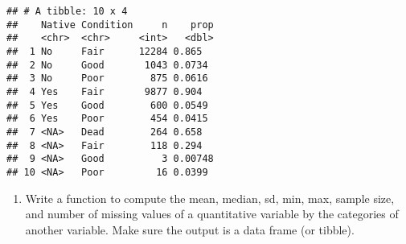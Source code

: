 \documentclass[
]{article}
\providecommand{\tightlist}{%
  \setlength{\itemsep}{0pt}\setlength{\parskip}{0pt}}
\begin{document}
\begin{verbatim}
## # A tibble: 10 x 4
##    Native Condition     n    prop
##    <chr>  <chr>     <int>   <dbl>
##  1 No     Fair      12284 0.865  
##  2 No     Good       1043 0.0734 
##  3 No     Poor        875 0.0616 
##  4 Yes    Fair       9877 0.904  
##  5 Yes    Good        600 0.0549 
##  6 Yes    Poor        454 0.0415 
##  7 <NA>   Dead        264 0.658  
##  8 <NA>   Fair        118 0.294  
##  9 <NA>   Good          3 0.00748
## 10 <NA>   Poor         16 0.0399
\end{verbatim}

\begin{enumerate}
\def\labelenumi{\alph{enumi}.}
\setcounter{enumi}{1}
\tightlist
\item
  Write a function to compute the mean, median, sd, min, max, sample
  size, and number of missing values of a quantitative variable by the
  categories of another variable. Make sure the output is a data frame
  (or tibble).
\end{enumerate}
\end{document}
